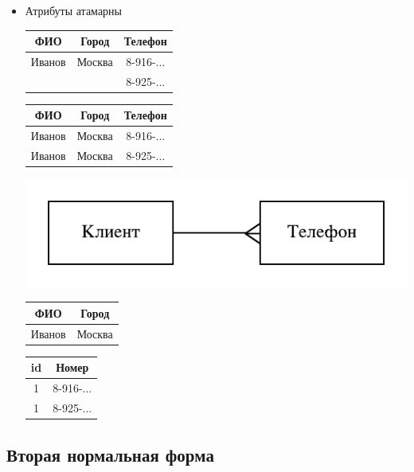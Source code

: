 \documentclass[a4paper, 14pt]{report}
\begin{document}
\begin{itemize}
    \item Атрибуты атамарны

        \begin{tabular}{|c|c|c|}
            \hline
            ФИО & Город & Телефон \\
            \hline
            Иванов & Москва & 8-916-... \\
                   &        & 8-925-... \\
            \hline
        \end{tabular}

        \begin{tabular}{|c|c|c|}
            \hline
            ФИО & Город & Телефон \\
            \hline
            Иванов & Москва & 8-916-... \\
            \hline
            Иванов & Москва & 8-925-... \\
            \hline
        \end{tabular}

        \includegraphics{db2}

        \begin{tabular}{|c|c|}
            \hline
            ФИО & Город \\
            \hline
            Иванов & Москва \\
            \hline
        \end{tabular}

        \begin{tabular}{|c|c|}
            \hline
            id & Номер \\
            \hline
            1 & 8-916-... \\
            \hline
            1 & 8-925-... \\
            \hline
        \end{tabular}

\end{itemize}

\subsection{Вторая нормальная форма}
\end{document}
